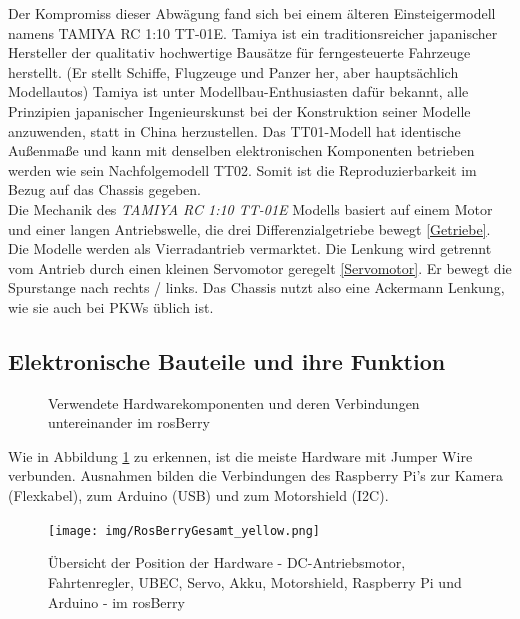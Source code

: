 \documentclass[conference]{IEEEtran}
\begin{document}
	Der Kompromiss dieser Abwägung fand sich bei einem älteren 
	Einsteigermodell namens TAMIYA RC 1:10 TT-01E. Tamiya \cite{Tamiya} ist ein 
	traditionsreicher japanischer Hersteller der qualitativ hochwertige 
	Bausätze für ferngesteuerte Fahrzeuge herstellt. (Er stellt Schiffe, Flugzeuge 
	und Panzer her, aber hauptsächlich Modellautos) Tamiya \cite{Tamiya} ist unter 
	Modellbau-Enthusiasten dafür bekannt, alle Prinzipien japanischer 
	Ingenieurskunst bei der Konstruktion seiner Modelle anzuwenden, statt 
	 in China herzustellen. Das TT01-Modell hat 
	identische Außenmaße und kann mit denselben elektronischen Komponenten 
	betrieben werden wie sein Nachfolgemodell TT02. Somit ist die 
	Reproduzierbarkeit im Bezug auf das Chassis gegeben.
	\\
	Die Mechanik des \textit{TAMIYA RC 1:10 TT-01E } Modells basiert auf 
	einem Motor und einer langen Antriebswelle, die drei Differenzialgetriebe 
	bewegt \ref{Getriebe}. Die Modelle werden als Vierradantrieb vermarktet. 
	Die Lenkung wird getrennt vom Antrieb durch einen kleinen Servomotor 
	geregelt \ref{Servomotor}. Er bewegt die Spurstange nach rechts / links. Das 
	Chassis nutzt also eine Ackermann Lenkung, wie sie auch bei PKWs üblich ist.
	
	\subsection{Elektronische Bauteile und ihre Funktion}\label{sec:Bauteile}
	\begin{figure} %
		\centering
		\def\svgwidth{9cm}
		
		\caption{Verwendete Hardwarekomponenten und deren Verbindungen untereinander im rosBerry}
		\label{Hardwarekomponenten}
	\end{figure}
	
	Wie in Abbildung \ref{Hardwarekomponenten} zu erkennen, ist die meiste Hardware mit Jumper Wire verbunden.
	Ausnahmen bilden die Verbindungen des Raspberry Pi's 
	zur Kamera (Flexkabel), zum Arduino (USB) und zum Motorshield (I2C).
	\\
	
	
	\begin{figure}[!ht]
		\centering
		\texttt{[image: img/RosBerryGesamt\_yellow.png]}
		\caption{Übersicht der Position der Hardware - DC-Antriebsmotor, Fahrtenregler, UBEC, Servo, Akku, Motorshield, Raspberry Pi und Arduino - im rosBerry}
		\label{rosBerryGesamt}
	\end{figure}
	
\end{document}
